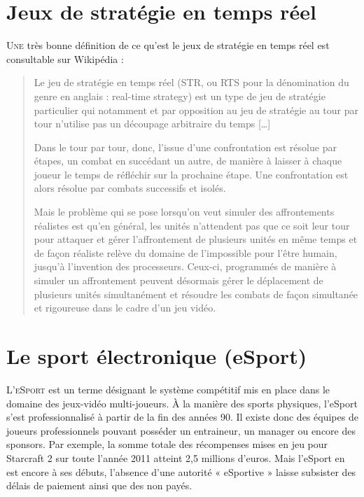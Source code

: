 \section{Jeux de stratégie en temps réel}%
\label{sec:jeux_de_strategie_en_temps_reel}

\lettrine{U}{ne} très bonne définition de ce qu'est le jeux de stratégie en
temps réel est consultable sur Wikipédia :

\begin{quote}

Le jeu de stratégie en temps réel (STR, ou RTS pour la
dénomination du genre en anglais : real-time strategy) est un type de
jeu de stratégie particulier qui notamment et par opposition au jeu de
stratégie au tour par tour n’utilise pas un découpage arbitraire du
temps [\ldots]

Dans le tour par tour, donc, l'issue d’une confrontation est résolue par
étapes, un combat en succédant un autre, de manière à laisser à chaque
joueur le temps de réfléchir sur la prochaine étape. Une confrontation
est alors résolue par combats successifs et isolés.

Mais le problème qui se pose lorsqu'on veut simuler des affrontements
réalistes est qu’en général, les unités n’attendent pas que ce soit leur
tour pour attaquer et gérer l'affrontement de plusieurs unités en même
temps et de façon réaliste relève du domaine de l'impossible pour l'être
humain, jusqu'à l'invention des processeurs. Ceux-ci, programmés de
manière à simuler un affrontement peuvent désormais gérer le déplacement
de plusieurs unités simultanément et résoudre les combats de façon
simultanée et rigoureuse dans le cadre d’un jeu vidéo.

\end{quote}

\section{Le sport électronique (eSport)}%
\label{sec:le_sport_electronique_esport_}

\lettrine{L}{’eSport} est un terme désignant le
système compétitif mis en place dans le domaine des jeux-vidéo
multi-joueurs. À la manière des sports physiques, l'eSport s’est
professionnalisé à partir de la fin des années 90. Il existe donc des
équipes de joueurs professionnels pouvant posséder un entraineur, un
manager ou encore des sponsors. Par exemple, la somme totale des
récompenses mises en jeu pour Starcraft 2 sur toute l’année 2011 atteint
2,5 millions d’euros.  Mais l'eSport en est encore à ses débuts,
l'absence d'une autorité « eSportive » laisse subsister des délais de
paiement ainsi que des non payés.

